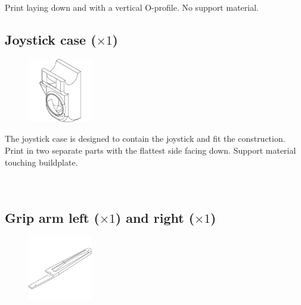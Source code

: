 \raisebox{-0.2cm}{\hspace{-1.5cm}\Huge\Info}\normalsize \quad Print laying down and with a vertical O-profile. No support material.


\subsection{Joystick case ($\times1$)}

\begin{figure}
    \vspace{-1.5cm}
    \includegraphics[width=0.25\textwidth]{PrintedParts/joystick_case.PNG}
\end{figure}

The joystick case is designed to contain the joystick and fit the construction.\\

\raisebox{-0.2cm}{\hspace{-1.5cm}\Huge\Info}\normalsize \quad Print in two separate parts with the flattest side facing down. Support material touching buildplate.\\\\\\


\subsection{Grip arm left ($\times1$) and right ($\times1$)}

\begin{figure}
    \vspace{-1.65cm}
    \includegraphics[width=0.25\textwidth]{PrintedParts/grip_arm_right.PNG}
\end{figure}

